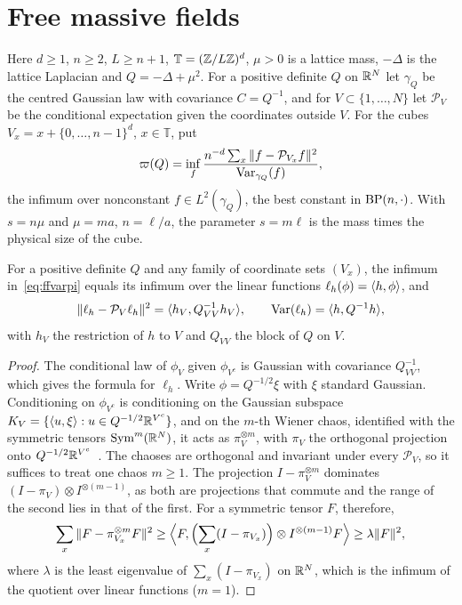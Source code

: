 \section{Free massive fields}\label{sec:free}

Here $d\ge1$, $n\ge2$, $L\ge n+1$, $\mathbb T=(\mathbb{Z}/L\mathbb{Z})^d$, $\mu>0$ is a lattice
mass, $-\Delta$ is the lattice Laplacian and $Q=-\Delta+\mu^2$. For a positive
definite $Q$ on $\mathbb{R}^N$ let $\gamma_Q$ be the centred Gaussian law with
covariance $C=Q^{-1}$, and for $V\subset\{1,\dots,N\}$ let $\mathcal P_V$ be the
conditional expectation given the coordinates outside $V$. For the cubes
$V_x=x+\{0,\dots,n-1\}^d$, $x\in\mathbb T$, put
\begin{equation}\label{eq:ffvarpi}
\varpi(Q)=\inf_f\frac{n^{-d}\sum_x\|f-\mathcal P_{V_x}f\|^2}{\operatorname{Var}_{\gamma_Q}(f)},
\end{equation}
the infimum over nonconstant $f\in L^2(\gamma_Q)$, the best constant in
$\mathrm{BP}(n,\cdot)$. With $s=n\mu$ and $\mu=ma$, $n=\ell/a$, the parameter $s=m\ell$
is the mass times the physical size of the cube.

\begin{lemma}\label{lem:chaos}
For a positive definite $Q$ and any family of coordinate sets $(V_x)$, the
infimum in~\eqref{eq:ffvarpi} equals its infimum over the linear functions
$\ell_h(\phi)=\langle h,\phi\rangle$, and
\[
\|\ell_h-\mathcal P_V\ell_h\|^2=\langle h_V,Q_{VV}^{-1}h_V\rangle,\qquad
\operatorname{Var}(\ell_h)=\langle h,Q^{-1}h\rangle,
\]
with $h_V$ the restriction of $h$ to $V$ and $Q_{VV}$ the block of $Q$ on $V$.
\end{lemma}

\begin{proof}
The conditional law of $\phi_V$ given $\phi_{V^c}$ is Gaussian with covariance
$Q_{VV}^{-1}$, which gives the formula for $\ell_h$. Write $\phi=Q^{-1/2}\xi$ with
$\xi$ standard Gaussian. Conditioning on $\phi_{V^c}$ is conditioning on the
Gaussian subspace $K_V=\{\langle u,\xi\rangle:u\in Q^{-1/2}\mathbb{R}^{V^c}\}$, and on the $m$-th
Wiener chaos, identified with the symmetric tensors $\mathrm{Sym}^m(\mathbb{R}^N)$, it
acts as $\pi_V^{\otimes m}$, with $\pi_V$ the orthogonal projection onto $Q^{-1/2}
\mathbb{R}^{V^c}$~\cite[Ch.~4]{Jan97}. The chaoses are orthogonal and invariant under
every $\mathcal P_V$, so it suffices to treat one chaos $m\ge1$. The projection
$I-\pi_V^{\otimes m}$ dominates $(I-\pi_V)\otimes I^{\otimes(m-1)}$, as both are
projections that commute and the range of the second lies in that of the
first. For a symmetric tensor $F$, therefore,
\[
\sum_x\|F-\pi_{V_x}^{\otimes m}F\|^2\ge\Bigl\langle F,\Bigl(\sum_x(I-\pi_{V_x})\Bigr)
\otimes I^{\otimes(m-1)}F\Bigr\rangle\ge\lambda\|F\|^2,
\]
where $\lambda$ is the least eigenvalue of $\sum_x(I-\pi_{V_x})$ on $\mathbb{R}^N$, which is
the infimum of the quotient over linear functions ($m=1$).
\end{proof}

